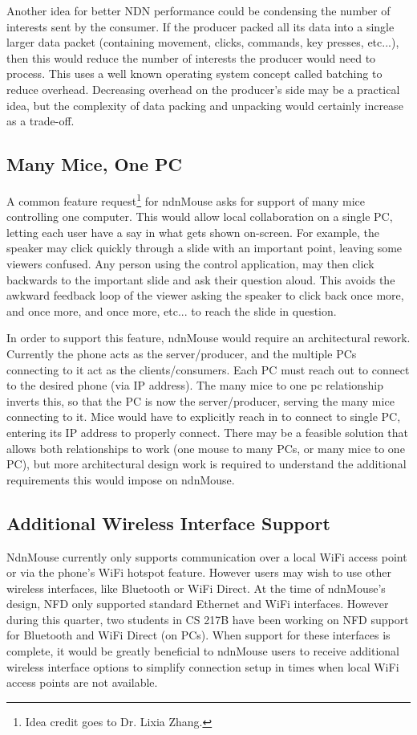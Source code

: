 \documentclass{sig-alternate}
\renewcommand\_{\textunderscore\allowbreak}  %
\begin{document}
Another idea for better NDN performance could be condensing the number of interests sent by the consumer. If the producer packed all its data into a single larger data packet (containing movement, clicks, commands, key presses, etc...), then this would reduce the number of interests the producer would need to process. This uses a well known operating system concept called batching to reduce overhead. Decreasing overhead on the producer's side may be a practical idea, but the complexity of data packing and unpacking would certainly increase as a trade-off.

\subsection{Many Mice, One PC}
A common feature request\footnote{Idea credit goes to Dr. Lixia Zhang.} for ndnMouse asks for support of many mice controlling one computer. This would allow local collaboration on a single PC, letting each user have a say in what gets shown on-screen. For example, the speaker may click quickly through a slide with an important point, leaving some viewers confused. Any person using the control application, may then click backwards to the important slide and ask their question aloud. This avoids the awkward feedback loop of the viewer asking the speaker to click back once more, and once more, and once more, etc... to reach the slide in question.

In order to support this feature, ndnMouse would require an architectural rework. Currently the phone acts as the server/producer, and the multiple PCs connecting to it act as the clients/consumers. Each PC must reach out to connect to the desired phone (via IP address). The many mice to one pc relationship inverts this, so that the PC is now the server/producer, serving the many mice connecting to it. Mice would have to explicitly reach in to connect to single PC, entering its IP address to properly connect. There may be a feasible solution that allows both relationships to work (one mouse to many PCs, or many mice to one PC), but more architectural design work is required to understand the additional requirements this would impose on ndnMouse.

\subsection{Additional Wireless Interface Support}
NdnMouse currently only supports communication over a local WiFi access point or via the phone's WiFi hotspot feature. However users may wish to use other wireless interfaces, like Bluetooth or WiFi Direct. At the time of ndnMouse's design, NFD only supported standard Ethernet and WiFi interfaces. However during this quarter, two students in CS 217B have been working on NFD support for Bluetooth and WiFi Direct (on PCs). When support for these interfaces is complete, it would be greatly beneficial to ndnMouse users to receive additional wireless interface options to simplify connection setup in times when local WiFi access points are not available.
\end{document}
